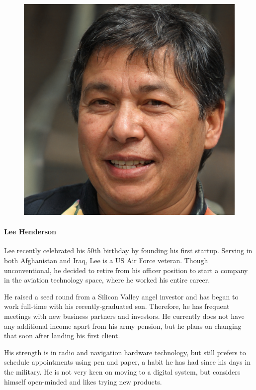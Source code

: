 \documentclass{article}
\begin{document}
\begin{figure}
	\includegraphics[scale=0.11]{persona-lee.jpg}
\end{figure}

\paragraph{Lee Henderson}

Lee recently celebrated his 50th birthday by founding his first startup. Serving in both Afghanistan and Iraq, Lee is a US Air Force veteran. Though unconventional, he decided to retire from his officer position to start a company in the aviation technology space, where he worked his entire career. 

He raised a seed round from a Silicon Valley angel investor and has began to work full-time with his recently-graduated son. Therefore, he has frequent meetings with new business partners and investors. He currently does not have any additional income apart from his army pension, but he plans on changing that soon after landing his first client.

His strength is in radio and navigation hardware technology, but still prefers to schedule appointments using pen and paper, a habit he has had since his days in the military. He is not very keen on moving to a digital system, but considers himself open-minded and likes trying new products.
\end{document}
